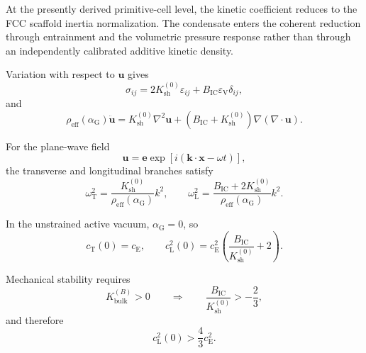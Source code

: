 At the presently derived primitive-cell level, the kinetic coefficient reduces to the FCC scaffold inertia normalization. The condensate enters the coherent reduction through entrainment and the volumetric pressure response rather than through an independently calibrated additive kinetic density.

Variation with respect to $\mathbf{u}$ gives
\begin{equation}
    \sigma_{ij}
    =
    2K_{\mathrm{sh}}^{(0)}
    \varepsilon_{ij}
    +
    B_{\mathrm{IC}}
    \varepsilon_{\mathrm{V}}
    \delta_{ij},
\end{equation}
and
\begin{equation}
    \rho_{\mathrm{eff}}(\alpha_{\mathrm{G}})
    \ddot{\mathbf{u}}
    =
    K_{\mathrm{sh}}^{(0)}
    \nabla^2\mathbf{u}
    +
    \left(
        B_{\mathrm{IC}}
        +
        K_{\mathrm{sh}}^{(0)}
    \right)
    \nabla
    \left(
        \nabla\cdot\mathbf{u}
    \right).
\end{equation}

For the plane-wave field
\begin{equation}
    \mathbf{u}
    =
    \mathbf{e}
    \exp
    \left[
        i
        \left(
            \mathbf{k}\cdot\mathbf{x}
            -
            \omega t
        \right)
    \right],
\end{equation}
the transverse and longitudinal branches satisfy
\begin{equation}
    \omega_{\mathrm{T}}^2
    =
    \frac{
        K_{\mathrm{sh}}^{(0)}
    }{
        \rho_{\mathrm{eff}}(\alpha_{\mathrm{G}})
    }
    k^2,
    \qquad
    \omega_{\mathrm{L}}^2
    =
    \frac{
        B_{\mathrm{IC}}
        +
        2K_{\mathrm{sh}}^{(0)}
    }{
        \rho_{\mathrm{eff}}(\alpha_{\mathrm{G}})
    }
    k^2.
\end{equation}

In the unstrained active vacuum, $\alpha_{\mathrm{G}}=0$, so
\begin{equation}
    c_{\mathrm{T}}(0)
    =
    c_{\mathrm{E}},
    \qquad
    c_{\mathrm{L}}^2(0)
    =
    c_{\mathrm{E}}^2
    \left(
        \frac{
            B_{\mathrm{IC}}
        }{
            K_{\mathrm{sh}}^{(0)}
        }
        +
        2
    \right).
\end{equation}

Mechanical stability requires
\begin{equation}
    K_{\mathrm{bulk}}^{(B)}
    >
    0
    \qquad
    \Longrightarrow
    \qquad
    \frac{
        B_{\mathrm{IC}}
    }{
        K_{\mathrm{sh}}^{(0)}
    }
    >
    -
    \frac{2}{3},
\end{equation}
and therefore
\begin{equation}
    c_{\mathrm{L}}^2(0)
    >
    \frac{4}{3}
    c_{\mathrm{E}}^2.
\end{equation}

